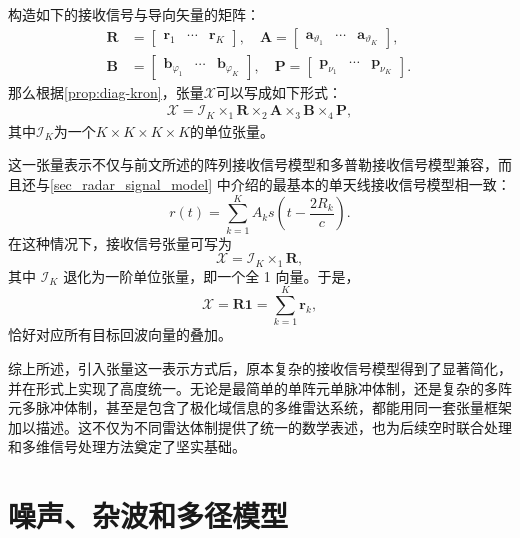 构造如下的接收信号与导向矢量的矩阵：
\[
    \begin{split}
        \mathbf{R} & = \begin{bmatrix}
                           \bm{r}_1 & \cdots & \bm{r}_K
                       \end{bmatrix}, \quad
        \mathbf{A} = \begin{bmatrix}
                         \bm{a}_{\vartheta_1} & \cdots & \bm{a}_{\vartheta_K}
                     \end{bmatrix}, \quad \\
        \mathbf{B} & = \begin{bmatrix}
                           \bm{b}_{\varphi_1} & \cdots & \bm{b}_{\varphi_K}
                       \end{bmatrix}, \quad
        \mathbf{P} = \begin{bmatrix}
                         \bm{p}_{\nu_1} & \cdots & \bm{p}_{\nu_K}
                     \end{bmatrix}.
    \end{split}
\]
那么根据\cref{prop:diag-kron}，张量\( \mathcal{X} \)可以写成如下形式：
\[
    \begin{split}
        \mathcal{X} = \mathcal{I}_K \times_1 \mathbf{R} \times_2 \mathbf{A} \times_3 \mathbf{B} \times_4 \mathbf{P},
    \end{split}
\]
其中\( \mathcal{I}_K \)为一个\( K \times K \times K \times K \)的单位张量。

这一张量表示不仅与前文所述的阵列接收信号模型和多普勒接收信号模型兼容，而且还与\cref{sec_radar_signal_model} 中介绍的最基本的单天线接收信号模型相一致：
\[
    r(t) = \sum_{k=1}^{K} A_k s\!\left(t - \frac{2 R_k}{c}\right).
\]
在这种情况下，接收信号张量可写为
\[
    \mathcal{X} = \mathcal{I}_K \times_1 \mathbf{R},
\]
其中 \(\mathcal{I}_K\) 退化为一阶单位张量，即一个全 1 向量。于是，
\[
    \mathcal{X} = \mathbf{R}\bm{1} = \sum_{k=1}^{K} \bm{r}_k,
\]
恰好对应所有目标回波向量的叠加。

综上所述，引入张量这一表示方式后，原本复杂的接收信号模型得到了显著简化，并在形式上实现了高度统一。无论是最简单的单阵元单脉冲体制，还是复杂的多阵元多脉冲体制，甚至是包含了极化域信息的多维雷达系统，都能用同一套张量框架加以描述。这不仅为不同雷达体制提供了统一的数学表述，也为后续空时联合处理和多维信号处理方法奠定了坚实基础。

\section{噪声、杂波和多径模型}

